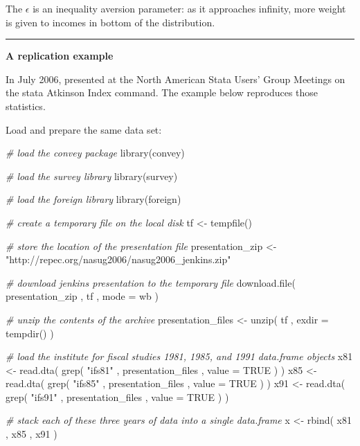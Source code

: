 \documentclass[
]{book}
\newenvironment{Shaded}{\begin{snugshade}}{\end{snugshade}}
\newcommand{\AttributeTok}[1]{\textcolor[rgb]{0.77,0.63,0.00}{#1}}
\newcommand{\CommentTok}[1]{\textcolor[rgb]{0.56,0.35,0.01}{\textit{#1}}}
\newcommand{\ConstantTok}[1]{\textcolor[rgb]{0.00,0.00,0.00}{#1}}
\newcommand{\FunctionTok}[1]{\textcolor[rgb]{0.00,0.00,0.00}{#1}}
\newcommand{\NormalTok}[1]{#1}
\newcommand{\OtherTok}[1]{\textcolor[rgb]{0.56,0.35,0.01}{#1}}
\newcommand{\StringTok}[1]{\textcolor[rgb]{0.31,0.60,0.02}{#1}}
\begin{document}
The \(\epsilon\) is an inequality aversion parameter: as it approaches infinity, more weight is given to incomes in bottom of the distribution.

\begin{center}\rule{0.5\linewidth}{0.5pt}\end{center}

\textbf{A replication example}

In July 2006, \textcite{jenkins2006} presented at the North American Stata Users' Group Meetings on the stata Atkinson Index command. The example below reproduces those statistics.

Load and prepare the same data set:

\begin{Shaded}
\begin{Highlighting}[]
\CommentTok{\# load the convey package}
\FunctionTok{library}\NormalTok{(convey)}

\CommentTok{\# load the survey library}
\FunctionTok{library}\NormalTok{(survey)}

\CommentTok{\# load the foreign library}
\FunctionTok{library}\NormalTok{(foreign)}

\CommentTok{\# create a temporary file on the local disk}
\NormalTok{tf }\OtherTok{\textless{}{-}} \FunctionTok{tempfile}\NormalTok{()}

\CommentTok{\# store the location of the presentation file}
\NormalTok{presentation\_zip }\OtherTok{\textless{}{-}} \StringTok{"http://repec.org/nasug2006/nasug2006\_jenkins.zip"}

\CommentTok{\# download jenkins\textquotesingle{} presentation to the temporary file}
\FunctionTok{download.file}\NormalTok{( presentation\_zip , tf , }\AttributeTok{mode =} \StringTok{\textquotesingle{}wb\textquotesingle{}}\NormalTok{ )}

\CommentTok{\# unzip the contents of the archive}
\NormalTok{presentation\_files }\OtherTok{\textless{}{-}} \FunctionTok{unzip}\NormalTok{( tf , }\AttributeTok{exdir =} \FunctionTok{tempdir}\NormalTok{() )}

\CommentTok{\# load the institute for fiscal studies\textquotesingle{} 1981, 1985, and 1991 data.frame objects}
\NormalTok{x81 }\OtherTok{\textless{}{-}} \FunctionTok{read.dta}\NormalTok{( }\FunctionTok{grep}\NormalTok{( }\StringTok{"ifs81"}\NormalTok{ , presentation\_files , }\AttributeTok{value =} \ConstantTok{TRUE}\NormalTok{ ) )}
\NormalTok{x85 }\OtherTok{\textless{}{-}} \FunctionTok{read.dta}\NormalTok{( }\FunctionTok{grep}\NormalTok{( }\StringTok{"ifs85"}\NormalTok{ , presentation\_files , }\AttributeTok{value =} \ConstantTok{TRUE}\NormalTok{ ) )}
\NormalTok{x91 }\OtherTok{\textless{}{-}} \FunctionTok{read.dta}\NormalTok{( }\FunctionTok{grep}\NormalTok{( }\StringTok{"ifs91"}\NormalTok{ , presentation\_files , }\AttributeTok{value =} \ConstantTok{TRUE}\NormalTok{ ) )}

\CommentTok{\# stack each of these three years of data into a single data.frame}
\NormalTok{x }\OtherTok{\textless{}{-}} \FunctionTok{rbind}\NormalTok{( x81 , x85 , x91 )}
\end{Highlighting}
\end{Shaded}
\end{document}
